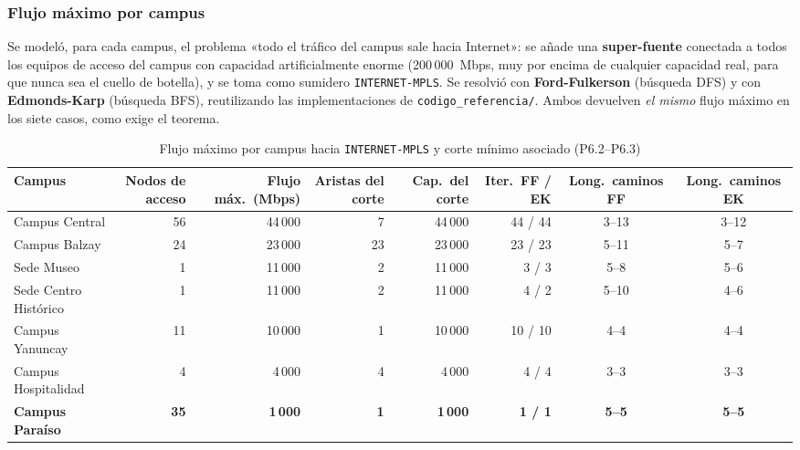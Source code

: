 \documentclass[10pt,a4paper]{extarticle}
\newcommand{\code}[1]{\texttt{\small #1}}
\begin{document}
\subsubsection{Flujo máximo por campus}

Se modeló, para cada campus, el problema «todo el tráfico del campus sale hacia Internet»:
se añade una \textbf{super-fuente} conectada a todos los equipos de acceso del campus con
capacidad artificialmente enorme (200\,000~Mbps, muy por encima de cualquier capacidad
real, para que nunca sea el cuello de botella), y se toma como sumidero
\code{INTERNET-MPLS}. Se resolvió con \textbf{Ford-Fulkerson} (búsqueda DFS) y con
\textbf{Edmonds-Karp} (búsqueda BFS), reutilizando las implementaciones de
\code{codigo\_referencia/}. Ambos devuelven \textit{el mismo} flujo máximo en los siete
casos, como exige el teorema.

\begin{table}[H]
\centering
\caption{Flujo máximo por campus hacia \code{INTERNET-MPLS} y corte mínimo asociado (P6.2--P6.3)}
\label{tab:flujo}
\small
\begin{adjustbox}{max width=\textwidth}
\begin{tabular}{lrrrrrcc}
\toprule
\textbf{Campus} & \textbf{Nodos de acceso} & \textbf{Flujo máx.\ (Mbps)} & \textbf{Aristas del corte} & \textbf{Cap.\ del corte} & \textbf{Iter.\ FF / EK} & \textbf{Long.\ caminos FF} & \textbf{Long.\ caminos EK} \\
\midrule
Campus Central        & 56 & 44\,000 &  7 & 44\,000 & 44 / 44 & 3--13 & 3--12 \\
Campus Balzay         & 24 & 23\,000 & 23 & 23\,000 & 23 / 23 & 5--11 & 5--7 \\
Sede Museo            &  1 & 11\,000 &  2 & 11\,000 &  3 / 3 & 5--8 & 5--6 \\
Sede Centro Histórico &  1 & 11\,000 &  2 & 11\,000 &  4 / 2 & 5--10 & 4--6 \\
Campus Yanuncay       & 11 & 10\,000 &  1 & 10\,000 & 10 / 10 & 4--4 & 4--4 \\
Campus Hospitalidad   &  4 &  4\,000 &  4 &  4\,000 &  4 / 4 & 3--3 & 3--3 \\
\textbf{Campus Paraíso} & \textbf{35} & \textbf{1\,000} & \textbf{1} & \textbf{1\,000} & \textbf{1 / 1} & \textbf{5--5} & \textbf{5--5} \\
\bottomrule
\end{tabular}
\end{adjustbox}
\end{table}
\end{document}
